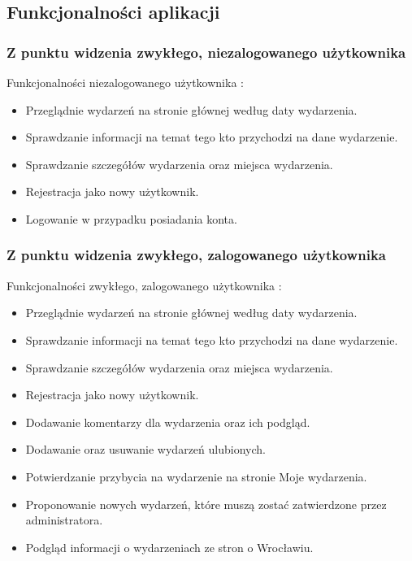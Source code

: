 \documentclass[a4paper]{article}
\begin{document}
\subsection{Funkcjonalności aplikacji}
\subsubsection{Z punktu widzenia zwykłego, niezalogowanego użytkownika}
Funkcjonalności niezalogowanego użytkownika :
\begin{itemize}
 \item Przeglądnie wydarzeń na stronie głównej według daty wydarzenia.
 \item Sprawdzanie informacji na temat tego kto przychodzi na dane wydarzenie.
 \item Sprawdzanie szczegółów wydarzenia oraz miejsca wydarzenia.
 \item Rejestracja jako nowy użytkownik.
 \item Logowanie w przypadku posiadania konta.
\end{itemize}
\subsubsection{Z punktu widzenia zwykłego, zalogowanego użytkownika}
Funkcjonalności zwykłego, zalogowanego użytkownika :
\begin{itemize}
 \item Przeglądnie wydarzeń na stronie głównej według daty wydarzenia.
 \item Sprawdzanie informacji na temat tego kto przychodzi na dane wydarzenie.
 \item Sprawdzanie szczegółów wydarzenia oraz miejsca wydarzenia.
 \item Rejestracja jako nowy użytkownik.
 \item Dodawanie komentarzy dla wydarzenia oraz ich podgląd. 
 \item Dodawanie oraz usuwanie wydarzeń ulubionych.
 \item Potwierdzanie przybycia na wydarzenie na stronie Moje wydarzenia.
 \item Proponowanie nowych wydarzeń, które muszą zostać zatwierdzone przez administratora.
 \item Podgląd informacji o wydarzeniach ze stron o Wrocławiu.
\end{itemize}
\end{document}
